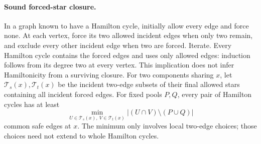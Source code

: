 \paragraph{Sound forced-star closure.}
In a graph known to have a Hamilton cycle, initially allow every edge and
force none. At each vertex, force its two allowed incident edges when only
two remain, and exclude every other incident edge when two are forced.
Iterate. Every Hamilton cycle contains the forced edges and uses only
allowed edges: induction follows from its degree two at every vertex.
This implication does not infer Hamiltonicity from a surviving closure.
For two components sharing $x$, let $\mathcal T_s(x),\mathcal T_t(x)$
be the incident two-edge subsets of their final allowed stars containing
all incident forced edges. For fixed pools $P,Q$, every pair of Hamilton
cycles has at least
\[
\min_{U\in\mathcal T_s(x),\ V\in\mathcal T_t(x)}
 |(U\cap V)\setminus(P\cup Q)|
\]
common safe edges at $x$. The minimum only involves local two-edge
choices; those choices need not extend to whole Hamilton cycles.
